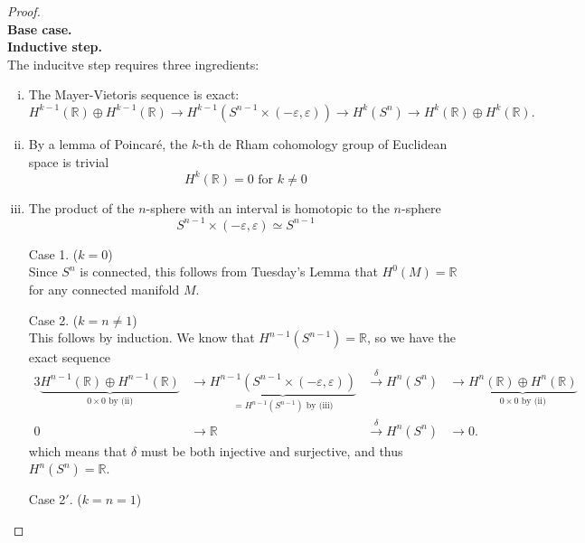 \documentclass{article}
\begin{document}
\begin{proof} \text{} \\
  \textbf{Base case.}\\
  \textbf{Inductive step.}\\
    The inducitve step requires three ingredients:
    \begin{enumerate}[(i)]
      \item The Mayer-Vietoris sequence is exact: \[
        H^{k-1}(\mathbb{R}) \oplus H^{k-1}(\mathbb{R})
        \rightarrow H^{k-1}(S^{n-1} \times (-\varepsilon, \varepsilon))
        \rightarrow H^k(S^n)
        \rightarrow H^k(\mathbb{R}) \oplus H^k(\mathbb{R}).
      \]
      \item By a lemma of Poincar\'e, the $k$-th de Rham cohomology group of
      Euclidean space is trivial \[
        H^k(\mathbb{R}) = 0 \text{ for } k \neq 0
      \]
      \item The product of the $n$-sphere with an interval is homotopic to the $n$-sphere \[
        S^{n-1} \times (-\varepsilon, \varepsilon) \simeq S^{n-1}
      \]
    \end{enumerate}
    \begin{enumerate}
      \item[Case 1.] ($k = 0$)\\
        Since $S^n$ is connected, this follows from Tuesday's Lemma that
        $H^0(M) = \mathbb{R}$ for any connected manifold $M$.
      \item[Case 2.] ($k = n \neq 1$)\\
        This follows by induction. We know that $H^{n-1}(S^{n-1}) = \mathbb{R}$,
        so we have the exact sequence \begin{alignat*}{3}
          \underbrace{H^{n-1}(\mathbb{R}) \oplus H^{n-1}(\mathbb{R})}_{0 \times 0 \text{ by (ii)}}
          &\rightarrow \underbrace{H^{n-1}(S^{n-1} \times (-\varepsilon, \varepsilon))}_{= H^{n-1}(S^{n-1}) \text{ by (iii)}}
          &\xrightarrow{\delta} H^n(S^n)
          &\rightarrow \underbrace{H^n(\mathbb{R}) \oplus H^n(\mathbb{R})}_{0 \times 0 \text{ by (ii)}}
          \\
          0 &\rightarrow \mathbb{R} &\xrightarrow{\delta} H^n(S^n) &\rightarrow 0.
        \end{alignat*} which means that $\delta$ must be both injective and
        surjective, and thus $H^n(S^n) = \mathbb{R}$.
      \item[Case 2$'$.] ($k = n = 1$)\\

\end{enumerate}
\end{proof}
\end{document}
